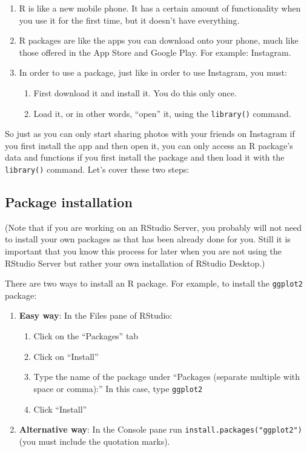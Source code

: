 \documentclass[12pt,]{krantz}
\providecommand{\tightlist}{%
  \setlength{\itemsep}{0pt}\setlength{\parskip}{0pt}}
\theoremstyle{definition}
\theoremstyle{definition}
\theoremstyle{definition}
\theoremstyle{remark}
\begin{document}
\begin{enumerate}
\def\labelenumi{\arabic{enumi}.}
\tightlist
\item
  R is like a new mobile phone. It has a certain amount of functionality
  when you use it for the first time, but it doesn't have everything.
\item
  R packages are like the apps you can download onto your phone, much
  like those offered in the App Store and Google Play. For example:
  Instagram.
\item
  In order to use a package, just like in order to use Instagram, you
  must:

  \begin{enumerate}
  \def\labelenumii{\arabic{enumii}.}
  \tightlist
  \item
    First download it and install it. You do this only once.
  \item
    Load it, or in other words, ``open'' it, using the
    \texttt{library()} command.
  \end{enumerate}
\end{enumerate}

So just as you can only start sharing photos with your friends on
Instagram if you first install the app and then open it, you can only
access an R package's data and functions if you first install the
package and then load it with the \texttt{library()} command. Let's
cover these two steps:

\subsection{Package installation}\label{package-installation}

(Note that if you are working on an RStudio Server, you probably will
not need to install your own packages as that has been already done for
you. Still it is important that you know this process for later when you
are not using the RStudio Server but rather your own installation of
RStudio Desktop.)

There are two ways to install an R package. For example, to install the
\texttt{ggplot2} package:

\begin{enumerate}
\def\labelenumi{\arabic{enumi}.}
\tightlist
\item
  \textbf{Easy way}: In the Files pane of RStudio:

  \begin{enumerate}
  \def\labelenumii{\alph{enumii})}
  \tightlist
  \item
    Click on the ``Packages'' tab
  \item
    Click on ``Install''
  \item
    Type the name of the package under ``Packages (separate multiple
    with space or comma):'' In this case, type \texttt{ggplot2}
  \item
    Click ``Install''
  \end{enumerate}
\item
  \textbf{Alternative way}: In the Console pane run
  \texttt{install.packages("ggplot2")} (you must include the quotation
  marks).
\end{enumerate}
\end{document}

